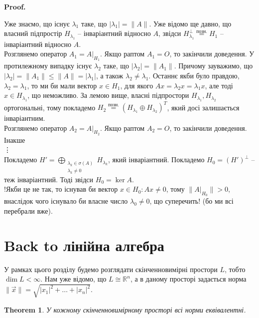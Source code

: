 \documentclass[a4paper, 10pt]{article}
\makeatletter
\theoremstyle{theoremdd}
\newtheorem{theorem}{Theorem}[subsection]
\theoremstyle{theoremdd}
\theoremstyle{theoremdd}
\theoremstyle{theoremdd}
\theoremstyle{theoremdd}
\theoremstyle{theoremdd}
\theoremstyle{theoremdd}
\theoremstyle{theoremdd}
\renewenvironment{proof}[1][Proof.\\]{\par
\pushQED{\hfill \qed}%
\normalfont \topsep6\p@\@plus6\p@\relax
\trivlist
\item\relax
{\bfseries
#1\@addpunct{.}}\hspace\labelsep\ignorespaces
}{%
\popQED\endtrivlist\@endpefalse
}
\makeatother
\begin{document}
\begin{proof}
Уже знаємо, що існує $\lambda_1$ таке, що $|\lambda_1| = \|A\|$. Уже відомо ще давно, що власний підпростір $H_{\lambda_1}$ -- інваріантний відносно $A$, звідси $H_{\lambda_1}^\perp \overset{\text{позн.}}{=} H_1$ -- інваріантний відносно $A$.\\
Розглянемо оператор $A_1 = A|_{H_1}$. Якщо раптом $A_1 = O$, то закінчили доведення. У протилежному випадку існує $\lambda_2$ таке, що $|\lambda_2| = \|A_1\|$. Причому зауважимо, що $|\lambda_2| = \|A_1\| \leq \|A\| = |\lambda_1|$, а також $\lambda_2 \neq \lambda_1$. Останнє якби було правдою, $\lambda_2 = \lambda_1$, то ми би мали вектор $x \in H_1$, для якого $Ax = \lambda_2 x = \lambda_1 x$, але тоді $x \in H_{\lambda_1}$, що неможливо. За лемою вище, власні підпростори $H_{\lambda_1}, H_{\lambda_2}$ ортогональні, тому покладемо $H_2 \overset{\text{позн.}}{=} \left(H_{\lambda_1} \oplus H_{\lambda_2}\right)^T$, який досі залишається інваріантним.\\
Розглянемо оператор $A_2 = A|_{H_2}$. Якщо раптом $A_2 = O$, то закінчили доведення. Інакше\\
\vdots \\
Покладемо $H' = \displaystyle\bigoplus_{\substack{\lambda_k \in \sigma(A) \\ \lambda_k \ne 0 }} H_{\lambda_k}$, який інваріантний. Покладемо $H_0 = (H')^\perp$ -- теж інваріантний. Тоді звідси $H_0 = \ker A$.\\
!Якби це не так, то існував би вектор $x \in H_0: Ax \neq 0$, тому $\|A|_{H_0}\| > 0$, внаслідок чого існувало би власне число $\lambda_0 \neq 0$, що суперечить! (бо ми всі перебрали вже).
\end{proof}

\newpage

\section*{Back to лінійна алгебра}
У рамках цього розділу будемо розглядати скінченновимірні простори $L$, тобто $\dim L < \infty$. Нам уже відомо, що $L \cong \mathbb{R}^n$, а в даному просторі задається норма $\|\vec{x}\| = \sqrt{|x_1|^2 + \dots + |x_n|^2}$.

\begin{theorem}
У кожному скінченновимірному просторі всі норми еквівалентні.
\end{theorem}
\end{document}
